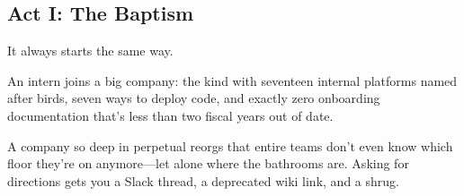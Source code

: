 \subsection{Act I: The Baptism}

It always starts the same way.

An intern joins a big company: the kind with seventeen internal platforms named after birds, seven ways to deploy code, and exactly zero onboarding documentation that's less than two fiscal years out of date.

A company so deep in perpetual reorgs that entire teams don’t even know which floor they're on anymore—let alone where the bathrooms are. Asking for directions gets you a Slack thread, a deprecated wiki link, and a shrug.

\medskip

